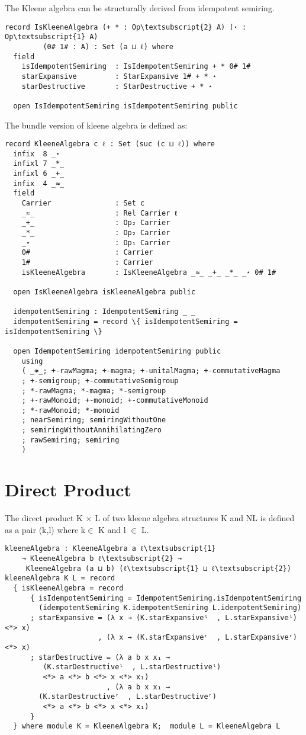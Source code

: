 The Kleene algebra can be structurally derived from idempotent semiring. 
\begin{Verbatim}[commandchars=\\\{\},samepage=true]
record IsKleeneAlgebra (+ * : Op\textsubscript{2} A) (⋆ : Op\textsubscript{1} A)
		 (0# 1# : A) : Set (a ⊔ ℓ) where
  field
    isIdempotentSemiring  : IsIdempotentSemiring + * 0# 1#
    starExpansive         : StarExpansive 1# + * ⋆
    starDestructive       : StarDestructive + * ⋆

  open IsIdempotentSemiring isIdempotentSemiring public
\end{Verbatim}
The bundle version of kleene algebra is defined as: 
\begin{Verbatim}[commandchars=\\\{\},samepage=true]
record KleeneAlgebra c ℓ : Set (suc (c ⊔ ℓ)) where
  infix  8 _⋆
  infixl 7 _*_
  infixl 6 _+_
  infix  4 _≈_
  field
    Carrier               : Set c
    _≈_                   : Rel Carrier ℓ
    _+_                   : Op₂ Carrier
    _*_                   : Op₂ Carrier
    _⋆                    : Op₁ Carrier
    0#                    : Carrier
    1#                    : Carrier
    isKleeneAlgebra       : IsKleeneAlgebra _≈_ _+_ _*_ _⋆ 0# 1#

  open IsKleeneAlgebra isKleeneAlgebra public

  idempotentSemiring : IdempotentSemiring _ _
  idempotentSemiring = record \{ isIdempotentSemiring = isIdempotentSemiring \}

  open IdempotentSemiring idempotentSemiring public
    using
    ( _≉_; +-rawMagma; +-magma; +-unitalMagma; +-commutativeMagma
    ; +-semigroup; +-commutativeSemigroup
    ; *-rawMagma; *-magma; *-semigroup
    ; +-rawMonoid; +-monoid; +-commutativeMonoid
    ; *-rawMonoid; *-monoid
    ; nearSemiring; semiringWithoutOne
    ; semiringWithoutAnnihilatingZero
    ; rawSemiring; semiring
    )
\end{Verbatim}
\section{Direct Product}
The direct product K \(\times\) L of two kleene algebra structures K and NL is defined as a pair (k,l) where k\(\in\) K and l \(\in\) L.
\begin{Verbatim}
kleeneAlgebra : KleeneAlgebra a ℓ\textsubscript{1} 
	→ KleeneAlgebra b ℓ\textsubscript{2} →
	 KleeneAlgebra (a ⊔ b) (ℓ\textsubscript{1} ⊔ ℓ\textsubscript{2})
kleeneAlgebra K L = record
  { isKleeneAlgebra = record
      { isIdempotentSemiring = IdempotentSemiring.isIdempotentSemiring 
		(idempotentSemiring K.idempotentSemiring L.idempotentSemiring)
      ; starExpansive = (λ x → (K.starExpansiveˡ  , L.starExpansiveˡ) <*> x)
                      , (λ x → (K.starExpansiveʳ  , L.starExpansiveʳ) <*> x)
      ; starDestructive = (λ a b x x₁ →
		 (K.starDestructiveˡ  , L.starDestructiveˡ)
		 <*> a <*> b <*> x <*> x₁)
                        , (λ a b x x₁ → 
		(K.starDestructiveʳ  , L.starDestructiveʳ)
		 <*> a <*> b <*> x <*> x₁)
      }
  } where module K = KleeneAlgebra K;  module L = KleeneAlgebra L
\end{Verbatim}

